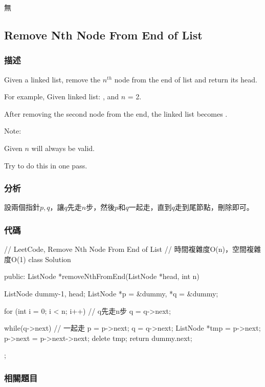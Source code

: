 \begindot
\item 無
\myenddot


\subsection{Remove Nth Node From End of List}
\label{sec:remove-nth-node-from-end-of-list}


\subsubsection{描述}
Given a linked list, remove the $n^{th}$ node from the end of list and return its head.

For example, Given linked list: , and $n$ = 2.

After removing the second node from the end, the linked list becomes .

Note:
\begindot
\item Given $n$ will always be valid.
\item Try to do this in one pass.
\myenddot


\subsubsection{分析}
設兩個指針$p,q$，讓$q$先走$n$步，然後$p$和$q$一起走，直到$q$走到尾節點，刪除即可。


\subsubsection{代碼}
\begin{Code}
// LeetCode, Remove Nth Node From End of List
// 時間複雜度O(n)，空間複雜度O(1)
class Solution {
public:
    ListNode *removeNthFromEnd(ListNode *head, int n) {
        ListNode dummy{-1, head};
        ListNode *p = &dummy, *q = &dummy;

        for (int i = 0; i < n; i++)  // q先走n步
            q = q->next;

        while(q->next) { // 一起走
            p = p->next;
            q = q->next;
        }
        ListNode *tmp = p->next;
        p->next = p->next->next;
        delete tmp;
        return dummy.next;
    }
};
\end{Code}


\subsubsection{相關題目}

